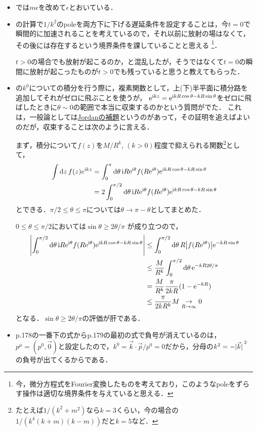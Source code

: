 	\begin{itemize}
	\item {}では$m\epsilon$を改めて$\epsilon$とおいている．

	\item {}の計算で$1/k^2$のpoleを両方下に下げる遅延条件を設定することは，今$t=0$で瞬間的に加速されることを考えているので，それ以前に放射の場はなくて，その後には存在するという境界条件を課していることと思える
	\footnote{今，微分方程式をFourier変換したものを考えており，このようなpoleをずらす操作は適切な境界条件を与えていると思える．}．

	$t>0$の場合でも放射が起こるのか，と混乱したが，そうではなくて$t=0$の瞬間に放射が起こったものが$t>0$でも残っていると思うと教えてもらった．
	\item {}の$k^0$についての積分を行う際に，複素関数として，上(下)半平面に積分路を追加してそれがゼロに飛ぶことを使うが，
	$\mathrm{e}^{\mathrm{i} kz} = \mathrm{e}^{\mathrm{i} kR\cos\theta - kR\sin\theta}$をゼロに飛ばしたときに$\theta \sim 0$の範囲で本当に収束するのかという質問がでた．
	これは，一般論としては\href{https://ja.wikipedia.org/wiki/\%E3\%82\%B8\%E3\%83\%A7\%E3\%83\%AB\%E3\%83\%80\%E3\%83\%B3\%E3\%81\%AE\%E8\%A3\%9C\%E9\%A1\%8C}{Jordanの補題}というのがあって，その証明を追えばよいのだが，収束することは次のように言える．

	まず，積分について$f(z)$を$M/R^k$, $(k>0)$程度で抑えられる関数\footnote{たとえば$1/(k^2 + m^2)$なら$k=3$くらい，今の場合の$1/(k^4(k+m)(k-m))$だと$k=5$など．}として，
	\begin{align}
		\int \dd{z}f(z)e^{\mathrm{i} kz} &= \int_{0}^{\pi} \dd{\theta}\mathrm{i} R\mathrm{e}^{\mathrm{i}\theta} f(R\mathrm{e}^{\mathrm{i}\theta})\mathrm{e}^{\mathrm{i} kR\cos\theta - kR\sin\theta}\\
		&= 2\int_{0}^{\pi/2} \dd{\theta}\mathrm{i} R\mathrm{e}^{\mathrm{i}\theta} f(R\mathrm{e}^{\mathrm{i}\theta})\mathrm{e}^{\mathrm{i} kR\cos\theta - kR\sin\theta}\\
	\end{align}
	とできる．$\pi/2 \leq \theta \leq \pi$については$\theta \to \pi-\theta$としてまとめた．

	$0 \leq \theta \leq \pi/2$においては$\sin\theta \geq 2\theta/\pi$
	が成り立つので，
	\begin{align}
		\abs{\int_{0}^{\pi/2} \dd{\theta}\mathrm{i} R\mathrm{e}^{\mathrm{i}\theta} f(R\mathrm{e}^{\mathrm{i}\theta})\mathrm{e}^{\mathrm{i} kR\cos\theta - kR\sin\theta}}
		&\leq \int_{0}^{\pi/2}\dd{\theta}R\abs{f(R\mathrm{e}^{\mathrm{i}\theta})}\mathrm{e}^{-kR\sin\theta}\\
		&\leq \frac{M}{R^k}\int_{0}^{\pi/2}\dd{\theta}\mathrm{e}^{-kR2\theta/\pi}\\
		&= \frac{M}{R^k}\frac{\pi}{2kR}(1 - \mathrm{e}^{-kR})\\
		&\leq \frac{\pi}{2kR^k}M \underset{R\to\infty}{\to} 0
	\end{align}
	となる．$\sin\theta \geq 2\theta / \pi$の評価が肝である．
	\item p.178の一番下の式からp.179の最初の式で負号が消えているのは，$p^{\mu} = (p^0, \vec{0})$と設定したので，$k^0 = \vec{k}\cdot \vec{p}/p^0 = 0$だから，分母の$k^2 = -\abs*{\vec{k}}^2$の負号が出てくるからである．


\end{itemize}
